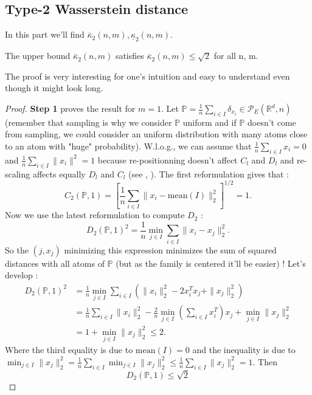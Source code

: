 \documentclass{amsart}
\newcommand{\RR}{\mathbb{R}}
\begin{document}
\subsection{Type-2 Wasserstein distance}
In this part we'll find $\bar{\kappa}_2\left(n,m\right), \underline\kappa_2\left(n,m\right)$.
\begin{theorem}
    The upper bound $\bar\kappa_2\left(n,m\right)$ satisfies $\bar\kappa_2\left(n,m\right)\leq \sqrt{2}$ for all n, m.
\end{theorem}
The proof is very interesting for one's intuition and easy to understand even though it might look long.
\begin{proof}
    \textbf{Step 1} proves the result for $m=1$. Let $\mathbb{P}=\frac{1}{n}\sum_{i\in I}\delta_{x_i}\in\mathcal{P}_E\left(\RR^d,n\right)$ (remember that sampling is why we consider $\mathbb{P}$ uniform and if $\mathbb{P}$ doesn't come from sampling, we could consider an uniform distribution with many atoms close to an atom with "huge" probability). W.l.o.g., we can assume that $\frac{1}{n}\sum_{i\in I}x_i=0$ and $\frac{1}{n}\sum_{i\in I}\lVert x_i\rVert^2=1$ because re-positionning doesn't affect $C_l$ and $D_l$ and re-scaling affects equally $D_l$ and $C_l$ (see , ).
    \newline
    The first reformulation gives that :
    $$
    C_2\left(\mathbb{P},1\right)=\left[\frac{1}{n}\sum_{i\in I}\lVert x_i-\text{mean}(I)\rVert_2^2\right]^{1/2}=1.
    $$
    Now we use the latest reformulation to compute $D_2$ :
    $$
    D_2\left(\mathbb{P},1\right)^2=\frac{1}{n}\min_{j\in I}\sum_{i\in I}\lVert x_i-x_j\rVert^2_2.
    $$
    So the $\left(j, x_j\right)$ minimizing this expression minimizes the sum of squared distances with all atoms of $\mathbb{P}$ (but as the family is centered it'll be easier) ! Let's develop :
    \begin{align*}
    D_2\left(\mathbb{P},1\right)^2&=\frac{1}{n}\min_{j\in I}\sum_{i\in I}\left(\rVert x_i\rVert^2_2-2x_i^Tx_j+\rVert x_j\rVert^2_2\right)\\&=\frac{1}{n}\sum_{i\in I}\lVert x_i\rVert_2^2-\frac{2}{n}\min_{j\in I}\left(\sum_{i\in I}x_i^T\right)x_j+\min_{j\in I}\lVert x_j\rVert^2_2 \\&=1+\min_{j\in I}\lVert x_j\rVert^2_2\leq2.
    \end{align*}
Where the third equality is due to $\text{mean}(I)=0$ and the inequality is due to $\min_{j\in I}\lVert x_j\rVert^2_2=\frac{1}{n}\sum_{i\in I}\min_{j\in I}\lVert x_j\rVert^2_2\leq \frac{1}{n}\sum_{i\in I}\lVert x_j\rVert^2_2=1$. Then $$D_2\left(\mathbb{P},1\right)\leq\sqrt{2}$$

\end{proof}
\end{document}
